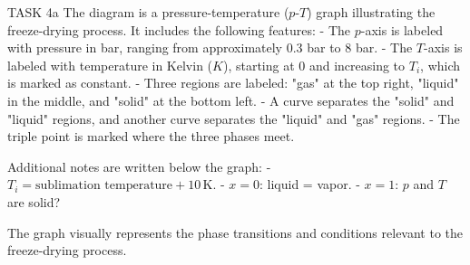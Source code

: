 TASK 4a  
The diagram is a pressure-temperature (\( p \)-\( T \)) graph illustrating the freeze-drying process. It includes the following features:  
- The \( p \)-axis is labeled with pressure in bar, ranging from approximately 0.3 bar to 8 bar.  
- The \( T \)-axis is labeled with temperature in Kelvin (\( K \)), starting at 0 and increasing to \( T_i \), which is marked as constant.  
- Three regions are labeled: "gas" at the top right, "liquid" in the middle, and "solid" at the bottom left.  
- A curve separates the "solid" and "liquid" regions, and another curve separates the "liquid" and "gas" regions.  
- The triple point is marked where the three phases meet.  

Additional notes are written below the graph:  
- \( T_i = \text{sublimation temperature} + 10 \, \text{K} \).  
- \( x = 0 \): liquid = vapor.  
- \( x = 1 \): \( p \) and \( T \) are solid?  

The graph visually represents the phase transitions and conditions relevant to the freeze-drying process.
